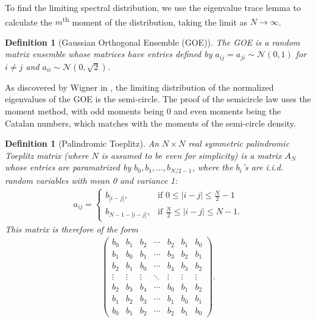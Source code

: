 \documentclass[11pt,reqno]{amsart}
\numberwithin{equation}{section}
\theoremstyle{plain}
\newtheorem{definition}[thm]{Definition}
\begin{document}
To find the limiting spectral distribution, we use the eigenvalue trace lemma to calculate the $m$\textsuperscript{th} moment of the distribution, taking the limit as $N\rightarrow\infty$.

\begin{definition}[Gaussian Orthogonal Ensemble (GOE)]
The GOE is a random matrix ensemble whose matrices have entries defined by $a_{ij}=a_{ji}\sim \mathcal{N}(0,1)$ for $i\neq j$ and $a_{ii}\sim \mathcal{N}(0,\sqrt{2})$.
\end{definition}

As discovered by Wigner in \cite{Wigner1}, 
the limiting distribution of the normalized eigenvalues of the GOE is the semi-circle. The proof of the semicircle law uses the moment method, with odd moments being $0$ and even moments being the Catalan numbers, which matches with the moments of the semi-circle density.

\begin{definition}[Palindromic Toeplitz]\cite{palindromicToeplitz}\label{Def-palindromicToeplitz}
An $N\times N$ real symmetric palindromic Toeplitz matrix (where $N$ is assumed to be even for simplicity) is a matrix $A_N$ whose entries are paramatrized by $b_0, b_1,\dots,b_{N/2-1}$, where the $b_i$'s are i.i.d. random variables with mean 0 and variance 1:
\begin{align}
a_{ij} = \begin{cases}
b_{|i-j|},& \text{if } 0\leq |i-j|\leq \frac{N}{2}-1\\
b_{N-1-|i-j|},& \text{if } \frac{N}{2}\leq |i-j|\leq N-1.
\end{cases}
\end{align}
This matrix is therefore of the form
\begin{align}
\begin{pmatrix}
b_0 & b_1 & b_2 & \cdots & b_2 & b_1 & b_0\\
b_1 & b_0 & b_1 & \cdots & b_3 & b_2 & b_1\\
b_2 & b_1 & b_0 & \cdots & b_4 & b_3 & b_2\\
\vdots & \vdots & \vdots & \ddots & \vdots & \vdots & \vdots\\
b_2 & b_3 & b_4 & \cdots & b_0 & b_1 & b_2\\
b_1 & b_2 & b_3 & \cdots & b_1 & b_0 & b_1\\
b_0 & b_1 & b_2 & \cdots & b_2 & b_1 & b_0
\end{pmatrix}.
\end{align}
\end{definition}
\end{document}
